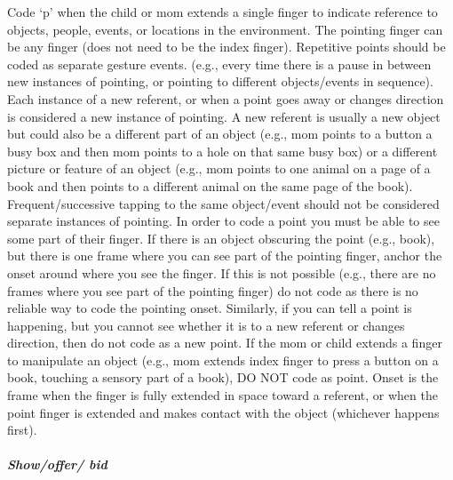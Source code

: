 \documentclass[
  12pt,
]{book}
\begin{document}
Code `p' when the child or mom extends a single finger to indicate reference to objects, people, events, or locations in the environment. The pointing finger can be any finger (does not need to be the index finger).
Repetitive points should be coded as separate gesture events. (e.g., every time there is a pause in between new instances of pointing, or pointing to different objects/events in sequence). Each instance of a new referent, or when a point goes away or changes direction is considered a new instance of pointing. A new referent is usually a new object but could also be a different part of an object (e.g., mom points to a button a busy box and then mom points to a hole on that same busy box) or a different picture or feature of an object (e.g., mom points to one animal on a page of a book and then points to a different animal on the same page of the book). Frequent/successive tapping to the same object/event should not be considered separate instances of pointing.
In order to code a point you must be able to see some part of their finger. If there is an object obscuring the point (e.g., book), but there is one frame where you can see part of the pointing finger, anchor the onset around where you see the finger. If this is not possible (e.g., there are no frames where you see part of the pointing finger) do not code as there is no reliable way to code the pointing onset. Similarly, if you can tell a point is happening, but you cannot see whether it is to a new referent or changes direction, then do not code as a new point.
If the mom or child extends a finger to manipulate an object (e.g., mom extends index finger to press a button on a book, touching a sensory part of a book), DO NOT code as point.
Onset is the frame when the finger is fully extended in space toward a referent, or when the point finger is extended and makes contact with the object (whichever happens first).

\hypertarget{show_offer_bid}{%
\subparagraph*{Show/offer/ bid}\label{show_offer_bid}}
\end{document}
